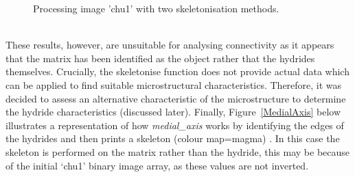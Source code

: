 \documentclass{article}
\begin{document}
	\begin{figure}[h]
		\centering
		\hfill
		\caption{Processing image 'chu1' with two skeletonisation methods. }
		\label{Skeletonise}
	\end{figure}
\\
	These results, however, are unsuitable for analysing connectivity as it appears that the matrix has been identified as the object rather that the hydrides themselves. Crucially, the skeletonise function does not provide actual data which can be applied to find suitable microstructural characteristics. Therefore, it was decided to assess an alternative characteristic of the microstructure to determine the hydride characteristics (discussed later). Finally, Figure~\ref{MedialAxis} below illustrates a representation of how \textit{medial\_axis} works by identifying the edges of the hydrides and then prints a skeleton (colour map=magma) \cite{Scikitimage}. In this case the skeleton is performed on the matrix rather than the hydride, this may be because of the initial ‘chu1’ binary image array, as these values are not inverted.
	\\
\end{document}
